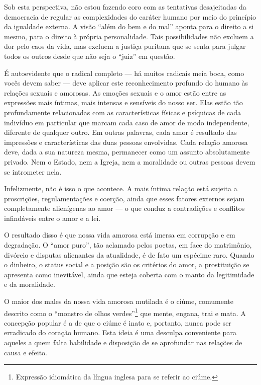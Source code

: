 Sob esta perspectiva, não estou fazendo coro com as tentativas desajeitadas da
democracia de regular as complexidades do caráter humano por meio do
princípio da igualdade externa. A visão ``além do bem e do mal'' aponta
para o direito a si mesmo, para o direito à própria personalidade. Tais
possibilidades não excluem a dor pelo caos da vida, mas excluem a
justiça puritana que se senta para julgar todos os outros desde que não
seja o ``juiz'' em questão.

É autoevidente que o radical completo --- há muitos radicais meia boca, \label{radical}
como vocês devem saber --- deve aplicar este reconhecimento profundo do
humano às relações sexuais e amorosas. As emoções sexuais e o amor estão
entre as expressões mais íntimas, mais intensas e sensíveis do nosso
ser. Elas estão tão profundamente relacionadas com as características
físicas e psíquicas de cada indivíduo em particular que marcam cada caso
de amor de modo independente, diferente de qualquer outro. Em outras
palavras, cada amor é resultado das impressões e características das
duas pessoas envolvidas. Cada relação amorosa deve, dada a sua natureza
mesma, permanecer como um assunto absolutamente privado. Nem o Estado,
nem a Igreja, nem a moralidade ou outras pessoas devem se intrometer nela.

Infelizmente, não é isso o que acontece. A mais íntima relação está
sujeita a proscrições, regulamentações e coerção, ainda que esses
fatores externos sejam completamente alienígenas ao amor --- o que conduz
a contradições e conflitos infindáveis entre o amor e a lei.

O resultado disso é que nossa vida amorosa está imersa em corrupção e em
degradação. O ``amor puro'', tão aclamado pelos poetas, em face do
matrimônio, divórcio e disputas alienantes da atualidade, é de fato um
espécime raro. Quando o dinheiro, o status social e a posição são os
critérios do amor, a prostituição se apresenta como inevitável, ainda
que esteja coberta com o manto da legitimidade e da moralidade.

O maior dos males da nossa vida amorosa mutilada é o ciúme, comumente
descrito como o ``monstro de olhos verdes''\footnote{Expressão
  idiomática da língua inglesa para se referir ao ciúme.} que mente,
engana, trai e mata. A concepção popular é a de que o ciúme é inato e,
portanto, nunca pode ser erradicado do coração humano. Esta ideia é uma
desculpa conveniente para aqueles a quem falta habilidade e disposição
de se aprofundar nas relações de causa e efeito.

